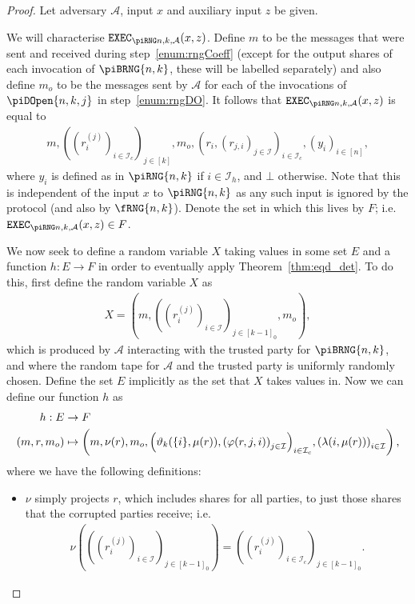 \documentclass{article}
\newcommand{\seq}[1]{\left[#1\right]}
\newcommand{\seqZ}[1]{\left[#1\right]_0}
\theoremstyle{remark}
\begin{document}
\begin{proof}
	\newcommand{\proto}{\piRNG{n,k}}

	Let adversary $\mathcal{A}$, input $x$ and auxiliary input $z$ be given.

	We will characterise $\execD$. Define $m$ to be the messages that were sent
	and received during step~\ref{enum:rngCoeff} (except for the output shares
	of each invocation of $\piBRNG{n,k}$, these will be labelled separately)
	and also define $m_o$ to be the messages sent by $\mathcal{A}$ for each of
	the invocations of $\piDOpen{n,k,j}$ in step~\ref{enum:rngDO}. It follows
	that $\execD$ is equal to
	\begin{align*}
		m,
		{\left(
			{\left(r_i^{(j)}\right)}_{i \in \mathcal{I}_c}
		\right)}_{j \in \seq{k}},
		m_o,
		{\left(
			r_i, {(r_{j,i})}_{j \in \mathcal{I}}
		\right)}_{i \in \mathcal{I}_c},
		{(y_i)}_{i \in \seq{n}},
	\end{align*}
	where $y_i$ is defined as in $\piRNG{n,k}$ if $i \in \mathcal{I}_h$, and
	$\bot$ otherwise. Note that this is independent of the input $x$ to
	$\piRNG{n,k}$ as any such input is ignored by the protocol (and also by
	$\fRNG{n,k}$). Denote the set in which this lives by $F$; i.e. $\execD \in
	F$.

	We now seek to define a random variable $X$ taking values in some set $E$
	and a function $h: E \to F$ in order to eventually apply
	Theorem~\ref{thm:eqd_det}. To do this, first define the random variable $X$
	as
	\begin{align*}
		X =
		\left(
			m,
			{\left(
				{\left(r_i^{(j)}\right)}_{i \in \mathcal{I}}
			\right)}_{j \in \seqZ{k-1}},
			m_o
		\right),
	\end{align*}
	which is produced by $\mathcal{A}$ interacting with the trusted party for
	$\piBRNG{n,k}$, and where the random tape for $\mathcal{A}$ and the trusted
	party is uniformly randomly chosen. Define the set $E$ implicitly as the
	set that $X$ takes values in. Now we can define our function $h$ as
	\begin{align*}
		\begin{aligned}
			h: E &\to F\\
			\left(
				m,
				r,
				m_o
			\right)
			&\mapsto
			\left(
				m,
				\nu(r),
				m_o,
				{\left(
					\vartheta_{k}(\{i\}, \mu(r)),
					{\left(\varphi(r, j, i)\right)}_{j \in \mathcal{I}}
				\right)}_{i \in \mathcal{I}_c},
				{\left(\lambda(i, \mu(r))\right)}_{i \in \mathcal{I}}
			\right),
		\end{aligned}
	\end{align*}
	where we have the following definitions:
	\begin{itemize}
		\item $\nu$ simply projects $r$, which includes shares for all parties,
			to just those shares that the corrupted parties receive; i.e.
			\begin{align*}
				\nu
				\left(
					{\left(
						{\left(
							r_i^{(j)}
						\right)}_{i \in \mathcal{I}}
					\right)}_{j \in \seqZ{k-1}}
				\right)
				=
				{\left(
					{\left(r_i^{(j)}\right)}_{i \in \mathcal{I}_c}
				\right)}_{j \in \seqZ{k-1}}.
			\end{align*}


\end{itemize}
\end{proof}
\end{document}
